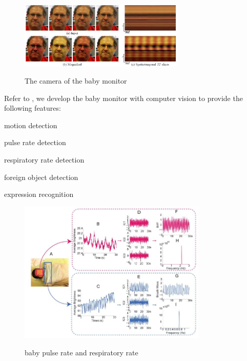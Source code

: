 \documentclass[a4paper,12pt]{article}
\begin{document}
\begin{figure}[h]
  \centering
	\includegraphics[width=0.7\textwidth, keepaspectratio=true]{mit-vidmag-teaser}
  \caption{The camera of the baby monitor}\cite{Wu12Eulerian}\cite{midvidmag-youtube}
  \label{fig:mit-vidmag}
\end{figure}

Refer to \cite{Poh2011Advancements}\cite{Wu12Eulerian}, we develop the baby monitor with computer vision to provide the following features:

\begin{compactitem}
\item motion detection
\end{compactitem}
\begin{compactitem}
\item pulse rate detection
\end{compactitem}
\begin{compactitem}
\item respiratory rate detection
\end{compactitem}
\begin{compactitem}
\item foreign object detection
\end{compactitem}
\begin{compactitem}
\item expression recognition
\end{compactitem}

\begin{figure}[b]
  \centering
	\includegraphics[width=0.8\textwidth, keepaspectratio=true]{baby-pr}
  \caption{baby pulse rate and respiratory rate}\cite{Hao-Yu-2013}
  \label{fig:baby-pr}
\end{figure}
\end{document}
